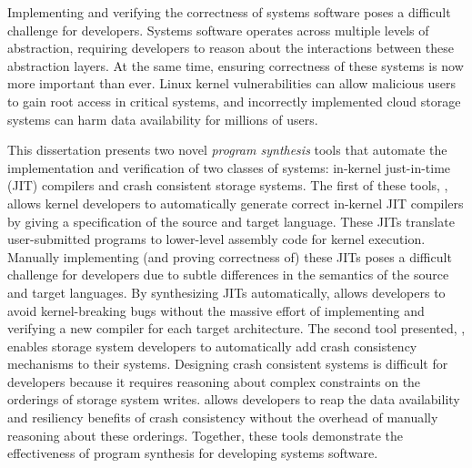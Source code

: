 Implementing and verifying the correctness of systems software
poses a difficult challenge for developers.
Systems software operates across multiple
levels of abstraction, requiring developers to reason about the
interactions between these abstraction layers.
At the same time, ensuring correctness of these systems is now
more important than ever.
Linux kernel vulnerabilities can allow malicious users to gain root access
in critical systems, and incorrectly implemented cloud storage systems
can harm data availability for millions of users.

This dissertation presents two novel \textit{program synthesis} tools
that automate the implementation and verification of two classes of systems:
in-kernel just-in-time (JIT) compilers and crash consistent storage systems.
The first of these tools, \jitsynth, allows kernel developers to automatically
generate correct in-kernel JIT compilers by giving a specification of the source and target language.
These JITs translate user-submitted programs to lower-level assembly code for kernel execution.
Manually implementing (and proving correctness of) these JITs poses a difficult challenge for developers
due to subtle differences in the semantics of the source and target languages.
By synthesizing JITs automatically, \jitsynth allows developers to avoid kernel-breaking bugs
without the massive effort of implementing and verifying a new compiler for each target architecture.
The second tool presented, \depsynth, enables storage system developers to
automatically add crash consistency mechanisms to their systems.
Designing crash consistent systems is difficult for developers because it
requires reasoning about complex constraints on the orderings of storage system writes.
\depsynth allows developers to reap the data availability and resiliency benefits of crash consistency
without the overhead of manually reasoning about these orderings.
Together, these tools demonstrate the effectiveness of program synthesis for developing systems software.
